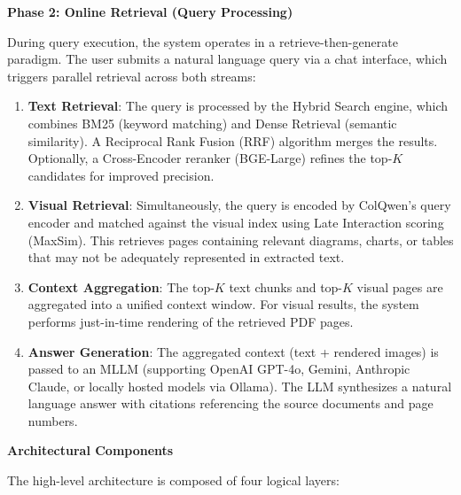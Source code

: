 \textbf{Phase 2: Online Retrieval (Query Processing)}

During query execution, the system operates in a retrieve-then-generate paradigm. The user submits a natural language query via a chat interface, which triggers parallel retrieval across both streams:

\begin{enumerate}
    \item \textbf{Text Retrieval}: The query is processed by the Hybrid Search engine, which combines BM25 (keyword matching) and Dense Retrieval (semantic similarity). A Reciprocal Rank Fusion (RRF) algorithm merges the results. Optionally, a Cross-Encoder reranker (BGE-Large) refines the top-$K$ candidates for improved precision.
    
    \item \textbf{Visual Retrieval}: Simultaneously, the query is encoded by ColQwen's query encoder and matched against the visual index using Late Interaction scoring (MaxSim). This retrieves pages containing relevant diagrams, charts, or tables that may not be adequately represented in extracted text.
    
    \item \textbf{Context Aggregation}: The top-$K$ text chunks and top-$K$ visual pages are aggregated into a unified context window. For visual results, the system performs just-in-time rendering of the retrieved PDF pages.
    
    \item \textbf{Answer Generation}: The aggregated context (text + rendered images) is passed to an MLLM (supporting OpenAI GPT-4o, Gemini, Anthropic Claude, or locally hosted models via Ollama). The LLM synthesizes a natural language answer with citations referencing the source documents and page numbers.
\end{enumerate}

\textbf{Architectural Components}

The high-level architecture is composed of four logical layers:

